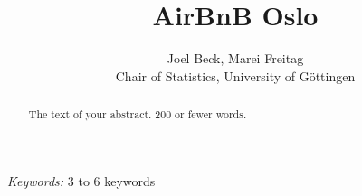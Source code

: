 \begin{titlepage}

\title{\bf AirBnB Oslo}

\author{Joel Beck, Marei Freitag \hspace{.2cm}\\ Chair of Statistics, University of G\"ottingen\\}

\maketitle

\bigskip

\begin{abstract}
    The text of your abstract.  200 or fewer words.
\end{abstract}

\noindent%
    {\it Keywords:}  3 to 6 keywords
\vfill

\end{titlepage}
